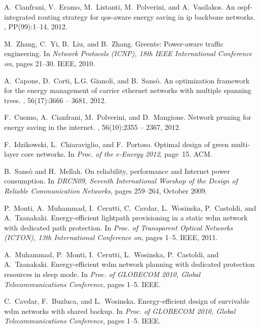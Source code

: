 \documentclass[final,5p,times,twocolumn]{elsarticle}
\begin{document}
\begin{thebibliography}{10}
A.~Cianfrani, V.~Eramo, M.~Listanti, M.~Polverini, and A.~Vasilakos.
\newblock An ospf-integrated routing strategy for qos-aware energy saving in ip
  backbone networks.
,
  PP(99):1--14, 2012.

M.~Zhang, C.~Yi, B.~Liu, and B.~Zhang.
\newblock Greente: Power-aware traffic engineering.
\newblock In {\em Network Protocols (ICNP), 18th IEEE International Conference
  on}, pages 21--30. IEEE, 2010.

A.~Capone, D.~Corti, L.G. Gianoli, and B.~Sans\`o.
\newblock An optimization framework for the energy management of carrier
  ethernet networks with multiple spanning trees.
, 56(17):3666 -- 3681, 2012.

F.~Cuomo, A.~Cianfrani, M.~Polverini, and D.~Mangione.
\newblock Network pruning for energy saving in the internet.
, 56(10):2355 -- 2367, 2012.

F.~Idzikowski, L.~Chiaraviglio, and F.~Portoso.
\newblock Optimal design of green multi-layer core networks.
\newblock In {\em Proc. of the e-Energy 2012}, page~15. ACM.

B.~Sans\`o and H.~Mellah.
\newblock On reliability, performance and {I}nternet power consumption.
\newblock In {\em DRCN09, Seventh International Worshop of the Design of
  Reliable Communication Networks}, pages 259--264, October 2009.

P.~Monti, A.~Muhammad, I.~Cerutti, C.~Cavdar, L.~Wosinska, P.~Castoldi, and
  A.~Tzanakaki.
\newblock Energy-efficient lightpath provisioning in a static wdm network with
  dedicated path protection.
\newblock In {\em Proc. of Transparent Optical Networks (ICTON), 13th
  International Conference on}, pages 1--5. IEEE, 2011.

A.~Muhammad, P.~Monti, I.~Cerutti, L.~Wosinska, P.~Castoldi, and A.~Tzanakaki.
\newblock Energy-efficient wdm network planning with dedicated protection
  resources in sleep mode.
\newblock In {\em Proc. of GLOBECOM 2010, Global Telecommunications
  Conference}, pages 1--5. IEEE.

C.~Cavdar, F.~Buzluca, and L.~Wosinska.
\newblock Energy-efficient design of survivable wdm networks with shared
  backup.
\newblock In {\em Proc. of GLOBECOM 2010, Global Telecommunications
  Conference}, pages 1--5. IEEE.


\end{thebibliography}
\end{document}
